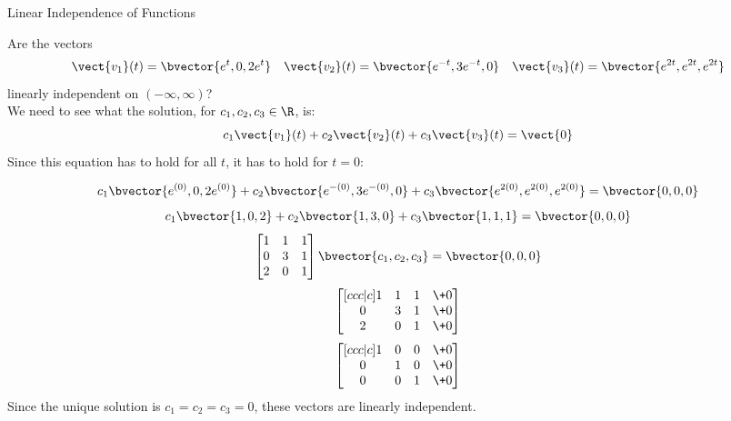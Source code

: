 \documentclass{beamer}
\begin{document}
\begin{frame}{Linear Independence of Functions}
\begin{example}
Are the vectors
\begin{equation*}
\vect{v_1}(t)=\bvector{e^t,0,2e^t} \quad
\vect{v_2}(t)=\bvector{e^{-t},3e^{-t},0} \quad
\vect{v_3}(t)=\bvector{e^{2t},e^{2t},e^{2t}}
\end{equation*}
linearly independent on $(-\infty,\infty)$?\\
We need to see what the solution, for $c_1,c_2,c_3\in\R$, is:
\begin{equation*}
c_1\vect{v_1}(t)+c_2\vect{v_2}(t)+c_3\vect{v_3}(t)=\vect{0}
\end{equation*}
Since this equation has to hold for all $t$, it has to hold for $t=0$:
\begin{overprint}
\begin{equation*}
c_1\bvector{e^{(0)},0,2e^{(0)}}+c_2\bvector{e^{-(0)},3e^{-(0)},0}+c_3\bvector{e^{2(0)},e^{2(0)},e^{2(0)}}=\bvector{0,0,0}
\end{equation*}
\begin{equation*}
c_1\bvector{1,0,2}+c_2\bvector{1,3,0}+c_3\bvector{1,1,1}=\bvector{0,0,0}
\end{equation*}
\begin{equation*}
\begin{bmatrix}
1 & 1 & 1 \\
0 & 3 & 1 \\
2 & 0 & 1 \\
\end{bmatrix}
\bvector{c_1, c_2, c_3}=\bvector{0,0,0}
\end{equation*}
\begin{equation*}
\begin{bmatrix}[ccc|c]
1 & 1 & 1 & \+0 \\
0 & 3 & 1 & \+0 \\
2 & 0 & 1 & \+0 \\
\end{bmatrix}
\end{equation*}
\begin{equation*}
\begin{bmatrix}[ccc|c]
1 & 0 & 0 & \+0 \\
0 & 1 & 0 & \+0 \\
0 & 0 & 1 & \+0 \\
\end{bmatrix}
\end{equation*}
\vspace{0.25cm}
Since the unique solution is $c_1=c_2=c_3=0$, these vectors are linearly independent.
\end{overprint}
\end{example}
\end{frame}
\end{document}
